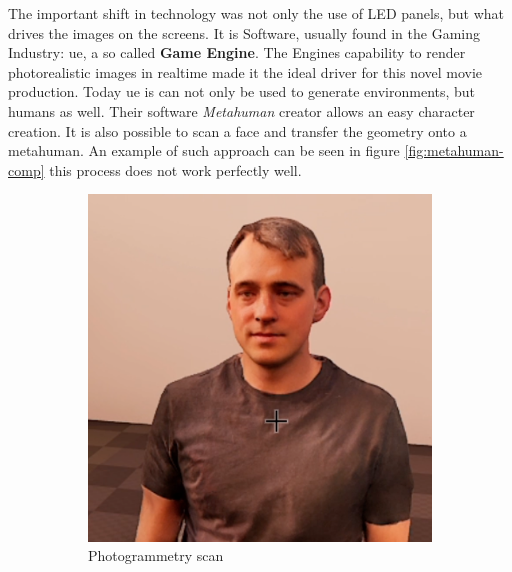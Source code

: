 \documentclass[
  a4paper,  %
  twoside,  %
  bibliography=totoc,
  headsepline,
  cleardoublepage=empty,
  parskip=half,
  draft=false
]{scrbook}
\begin{document}
The important shift in technology was not only the use of LED panels, but what drives the images on the screens. It is Software, usually found in the Gaming Industry: \gls{ue}, a so called \textbf{Game Engine}. The Engines capability to render photorealistic images in realtime made it the ideal driver for this novel movie production. Today \gls{ue} is can not only be used to generate environments, but humans as well. Their software \textit{Metahuman} creator allows an easy character creation. It is also possible to scan a face and transfer the geometry onto a metahuman. An example of such approach can be seen in figure \ref{fig:metahuman-comp} this process does not work perfectly well. 

\begin{figure}[h]
  \centering
  \begin{subfigure}[b]{0.45\textwidth}
    \includegraphics[width=\textwidth]{./graphics/images/photogrammetry.png}
    \caption{Photogrammetry scan}
  \end{subfigure}
  \hfill
  \begin{subfigure}[b]{0.5\textwidth}

\end{subfigure}
\end{figure}
\end{document}
